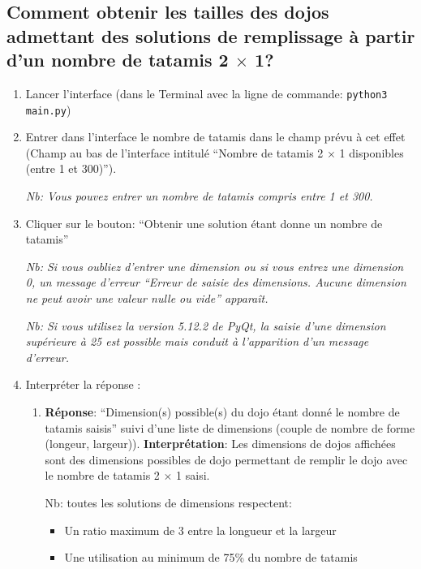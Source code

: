 \subsection{Comment obtenir les tailles des dojos admettant des solutions de remplissage à partir d’un nombre de tatamis 2 $\times$ 1?}

\begin{enumerate}
    \item Lancer l’interface (dans le Terminal avec la ligne de commande: \texttt{python3 main.py})
    \item Entrer dans l’interface le nombre de tatamis dans le champ prévu à cet effet (Champ au bas de l’interface intitulé
          “Nombre de tatamis 2 $\times$ 1 disponibles (entre 1 et 300)”).

          \emph{Nb: Vous pouvez entrer un nombre de tatamis compris entre 1 et 300.}

    \item Cliquer sur le bouton: “Obtenir une solution étant donne un nombre de tatamis”

          \emph{Nb: Si vous oubliez d’entrer une dimension ou si vous entrez une dimension 0,
              un message d’erreur “Erreur de saisie des dimensions.
              Aucune dimension ne peut avoir une valeur nulle ou vide” apparaît.}

          \emph{Nb: Si vous utilisez la version 5.12.2 de PyQt, la saisie d'une dimension supérieure à 25 est possible mais
              conduit à l'apparition d’un message d’erreur.}

    \item Interpréter la réponse :
          \begin{enumerate}
              \item \textbf{Réponse}: “Dimension(s) possible(s) du dojo étant donné le nombre de tatamis saisis” suivi
                    d’une liste de dimensions (couple de nombre de forme (longeur, largeur)).
                    \textbf{Interprétation}: Les dimensions de dojos affichées sont des dimensions possibles de dojo permettant
                    de remplir le dojo avec le nombre de tatamis 2 $\times$ 1 saisi.

                    Nb: toutes les solutions de dimensions respectent:
                    \begin{itemize}
                        \item Un ratio maximum de 3 entre la longueur et la largeur
                        \item Une utilisation au minimum de 75\% du nombre de tatamis
                    \end{itemize}


\end{enumerate}
\end{enumerate}
